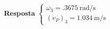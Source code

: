 \textbf{Resposta}
$
\begin{cases}
	\omega_{3}=\SI{.3675}{\radian/\second}\\
	(v_{P})_{3}=\SI{1.034}{\meter/\second}
\end{cases}
$